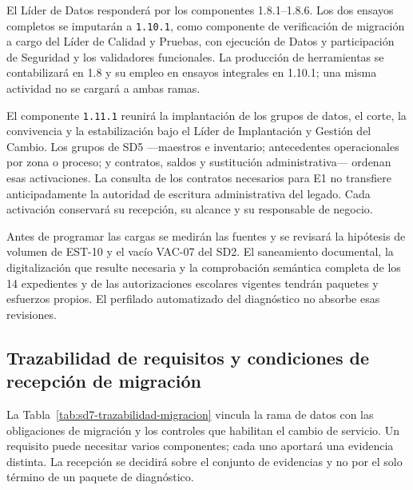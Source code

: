 El Líder de Datos responderá por los componentes 1.8.1--1.8.6. Los dos ensayos completos se imputarán a \texttt{1.10.1}, como componente de verificación de migración a cargo del Líder de Calidad y Pruebas, con ejecución de Datos y participación de Seguridad y los validadores funcionales. La producción de herramientas se contabilizará en 1.8 y su empleo en ensayos integrales en 1.10.1; una misma actividad no se cargará a ambas ramas.

El componente \texttt{1.11.1} reunirá la implantación de los grupos de datos, el corte, la convivencia y la estabilización bajo el Líder de Implantación y Gestión del Cambio. Los grupos de SD5 ---maestros e inventario; antecedentes operacionales por zona o proceso; y contratos, saldos y sustitución administrativa--- ordenan esas activaciones. La consulta de los contratos necesarios para E1 no transfiere anticipadamente la autoridad de escritura administrativa del legado. Cada activación conservará su recepción, su alcance y su responsable de negocio.

Antes de programar las cargas se medirán las fuentes y se revisará la hipótesis de volumen de EST-10 y el vacío VAC-07 del SD2. El saneamiento documental, la digitalización que resulte necesaria y la comprobación semántica completa de los 14 expedientes y de las autorizaciones escolares vigentes tendrán paquetes y esfuerzos propios. El perfilado automatizado del diagnóstico no absorbe esas revisiones.

\subsection{Trazabilidad de requisitos y condiciones de recepción de migración}
La Tabla~\ref{tab:sd7-trazabilidad-migracion} vincula la rama de datos con las obligaciones de migración y los controles que habilitan el cambio de servicio. Un requisito puede necesitar varios componentes; cada uno aportará una evidencia distinta. La recepción se decidirá sobre el conjunto de evidencias y no por el solo término de un paquete de diagnóstico.

